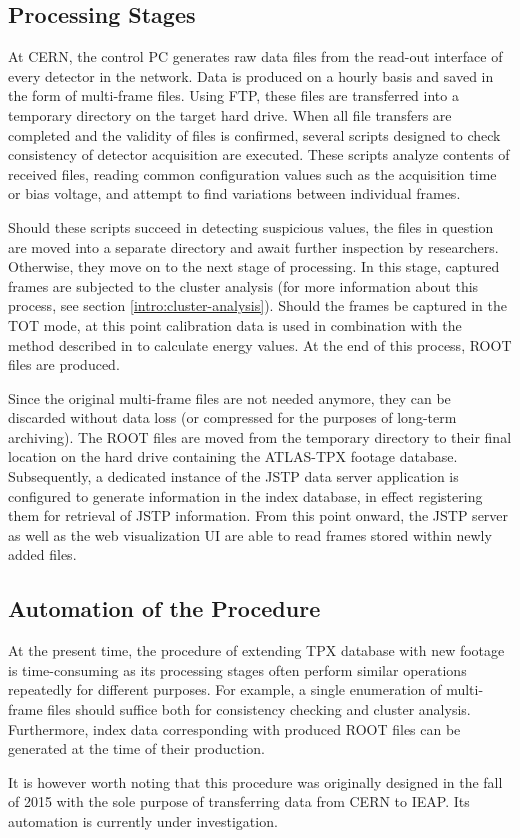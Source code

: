 \subsection{Processing Stages}
At CERN, the control PC generates raw data files from the read-out interface of every detector in the network. Data is produced on a hourly basis and saved in the form of multi-frame files. Using FTP, these files are transferred into a temporary directory on the target hard drive. When all file transfers are completed and the validity of files is confirmed, several scripts designed to check consistency of detector acquisition are executed. These scripts analyze contents of received files, reading common configuration values such as the acquisition time or bias voltage, and attempt to find variations between individual frames.

Should these scripts succeed in detecting suspicious values, the files in question are moved into a separate directory and await further inspection by researchers. Otherwise, they move on to the next stage of processing. In this stage, captured frames are subjected to the cluster analysis (for more information about this process, see section \ref{intro:cluster-analysis}). Should the frames be captured in the TOT mode, at this point calibration data is used in combination with the method described in \cite{Jakubek2011S262} to calculate energy values. At the end of this process, ROOT files are produced.

Since the original multi-frame files are not needed anymore, they can be discarded without data loss (or compressed for the purposes of long-term archiving). The ROOT files are moved from the temporary directory to their final location on the hard drive containing the ATLAS-TPX footage database. Subsequently, a dedicated instance of the JSTP data server application is configured to generate information in the index database, in effect registering them for retrieval of JSTP information. From this point onward, the JSTP server as well as the web visualization UI are able to read frames stored within newly added files.

\subsection{Automation of the Procedure}
\label{import-automation}
At the present time, the procedure of extending TPX database with new footage is time-consuming as its processing stages often perform similar operations repeatedly for different purposes. For example, a single enumeration of multi-frame files should suffice both for consistency checking and cluster analysis. Furthermore, index data corresponding with produced ROOT files can be generated at the time of their production.

It is however worth noting that this procedure was originally designed in the fall of 2015 with the sole purpose of transferring data from CERN to IEAP. Its automation is currently under investigation.
